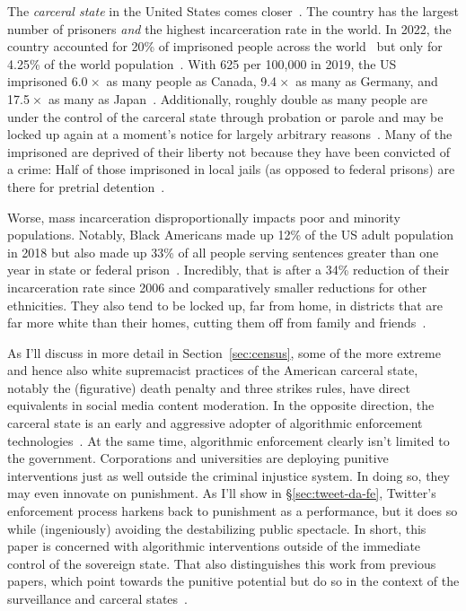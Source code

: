 The \emph{carceral state} in the United States comes closer~\cite{Simon2007}.
The country has the largest number of prisoners \emph{and} the highest
incarceration rate in the world. In 2022, the country accounted for 20\% of
imprisoned people across the world~\cite{SawyerWagner2022} but only for 4.25\%
of the world population~\cite{Worldometer2023}. With 625 per 100,000 in 2019,
the US imprisoned 6.0$\mspace{1mu}\times$ as many people as Canada,
9.4$\mspace{1mu}\times$ as many as Germany, and 17.5$\mspace{1mu}\times$ as many
as Japan~\cite{WorldPrisonBrief2023}. Additionally, roughly double as many
people are under the control of the carceral state through probation or parole
and may be locked up again at a moment's notice for largely arbitrary
reasons~\cite{SawyerWagner2022}. Many of the imprisoned are deprived of their
liberty not because they have been convicted of a crime: Half of those
imprisoned in local jails (as opposed to federal prisons) are there for pretrial
detention~\cite{SawyerWagner2022}.

Worse, mass incarceration disproportionally impacts poor and minority
populations. Notably, Black Americans made up 12\% of the US adult population in
2018 but also made up 33\% of all people serving sentences greater than one year
in state or federal prison~\cite{Gramlich2020}. Incredibly, that is after a 34\%
reduction of their incarceration rate since 2006 and comparatively smaller
reductions for other ethnicities. They also tend to be locked up, far from home,
in districts that are far more white than their homes, cutting them off from
family and friends~\cite{WagnerKopf2015}.

As I'll discuss in more detail in Section~\ref{sec:census}, some of the more
extreme and hence also white supremacist practices of the American carceral
state, notably the (figurative) death penalty and three strikes rules, have
direct equivalents in social media content moderation. In the opposite
direction, the carceral state is an early and aggressive adopter of algorithmic
enforcement
technologies~\cite{AngwinLarsonea2016,EPIC2020,Hao2019,ReddenODonovanDixea2020,Yampolskiy2016}.
At the same time, algorithmic enforcement clearly isn't limited to the
government. Corporations and universities are deploying punitive interventions
just as well outside the criminal injustice system. In doing so, they may even
innovate on punishment. As I'll show in \S\ref{sec:tweet-da-fe}, Twitter's
enforcement process harkens back to punishment as a performance, but it does so
while (ingeniously) avoiding the destabilizing public spectacle. In short, this
paper is concerned with algorithmic interventions outside of the immediate
control of the sovereign state. That also distinguishes this work from previous
papers, which point towards the punitive potential but do so in the context of
the surveillance and carceral
states~\cite{DehlendorfGerety2021,McElroyWhittakerea2021}.

